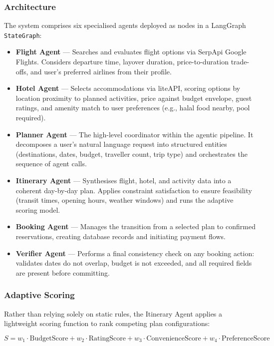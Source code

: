 \documentclass[12pt, a4paper]{article}
\begin{document}
\subsubsection{Architecture}

The system comprises six specialised agents deployed as nodes in a LangGraph \texttt{StateGraph}:

\begin{itemize}[leftmargin=1.5cm, itemsep=0.4em]
  \item \textbf{Flight Agent} --- Searches and evaluates flight options via SerpApi Google Flights. Considers departure time, layover duration, price-to-duration trade-offs, and user's preferred airlines from their profile.
  \item \textbf{Hotel Agent} --- Selects accommodations via liteAPI, scoring options by location proximity to planned activities, price against budget envelope, guest ratings, and amenity match to user preferences (e.g., halal food nearby, pool required).
  \item \textbf{Planner Agent} --- The high-level coordinator within the agentic pipeline. It decomposes a user's natural language request into structured entities (destinations, dates, budget, traveller count, trip type) and orchestrates the sequence of agent calls.
  \item \textbf{Itinerary Agent} --- Synthesises flight, hotel, and activity data into a coherent day-by-day plan. Applies constraint satisfaction to ensure feasibility (transit times, opening hours, weather windows) and runs the adaptive scoring model.
  \item \textbf{Booking Agent} --- Manages the transition from a selected plan to confirmed reservations, creating database records and initiating payment flows.
  \item \textbf{Verifier Agent} --- Performs a final consistency check on any booking action: validates dates do not overlap, budget is not exceeded, and all required fields are present before committing.
\end{itemize}

\subsubsection{Adaptive Scoring}

Rather than relying solely on static rules, the Itinerary Agent applies a lightweight scoring function to rank competing plan configurations:

\begin{equation}
  S = w_1 \cdot \text{BudgetScore} + w_2 \cdot \text{RatingScore} + w_3 \cdot \text{ConvenienceScore} + w_4 \cdot \text{PreferenceScore}
\end{equation}
\end{document}
